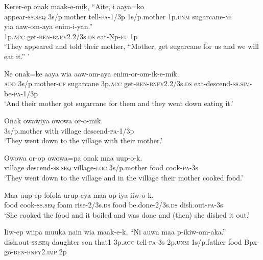 \ea
\gll  Kerer-ep  onak  maak-e-mik,  “Aite,  i  aaya=ko \\
appear-\textsc{ss.seq}  3s/p.mother  tell-\textsc{pa}-1/3p  1s/p.mother  1p.\textsc{unm}  sugarcane-\textsc{nf} \\
yia  aaw-om-aya  enim-i-yan.” \\
1p.\textsc{acc}  get-\textsc{ben}-\textsc{bnfy}2.2/3s.\textsc{ds}  eat-Np-\textsc{fu}.1p \\
\glt ‘They appeared and told their mother, “Mother, get sugarcane for us and we will eat it.” ’ \\
\z


\ea
\gll  Ne  onak=ke  aaya  wia  aaw-om-aya                       enim-or-om-ik-e-mik. \\
\textsc{add}  3s/p.mother-\textsc{cf}  sugarcane  3p.\textsc{acc}  get-\textsc{ben}-\textsc{bnfy}2.2/3s.\textsc{ds}  eat-descend-\textsc{ss}.\textsc{sim}-be-\textsc{pa}-1/3p \\


\glt ‘And their mother got sugarcane for them and they went down eating it.’ \\
\z


\ea
\gll  Onak  owawiya  owowa  or-o-mik. \\
3s/p.mother  with  village  descend-\textsc{pa}-1/3p \\
\glt ‘They went down to the village with their mother.’ \\
\z


\ea
\gll  Owowa  or-op  owowa=pa  onak  maa  uup-o-k. \\
village  descend-\textsc{ss.seq}  village-\textsc{loc}  3s/p.mother  food  cook-\textsc{pa}-3s \\
\glt ‘They went down to the village and in the village their mother cooked food.’ \\
\z


\ea
\gll  Maa  uup-ep  fofola  urup-eya  maa  op-iya  iiw-o-k. \\
food  cook-\textsc{ss.seq}  foam  rise-2/3s.\textsc{ds}  food  be.done-2/3s.\textsc{ds}  dish.out-\textsc{pa}-3s \\
\glt ‘She cooked the food and it boiled and was done and (then) she dished it out.’ \\
\z


\ea
\gll  Iiw-ep  wiipa  muuka  nain  wia  maak-e-k,  “Ni              auwa  maa  p-ikiw-om-aka.” \\
dish.out-\textsc{ss.seq}  daughter  son  that1  3p.\textsc{acc}  tell-\textsc{pa}-3s  2p.\textsc{unm}  1s/p.father  food  Bpx-go-\textsc{ben}-\textsc{bnfy}2.\textsc{imp}.2p \\


